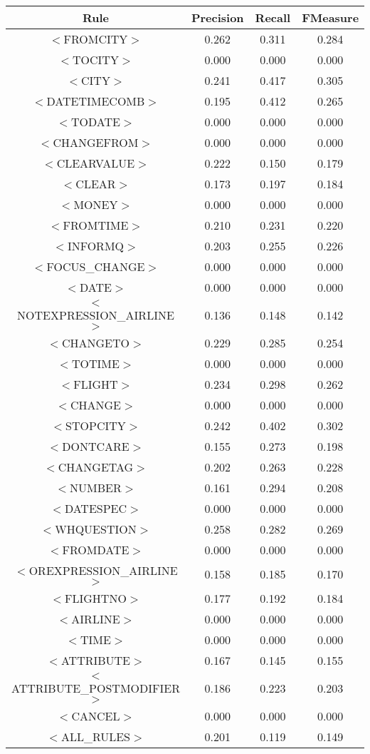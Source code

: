 \documentclass[a4paper,10pt]{article}
\begin{document}
\pagebreak
{} \label{tab:title} 
\begin{center}
\begin{tabular}{|c||c|c|c|}
\hline
Rule&Precision&Recall&FMeasure\\
\hline
\hline
$<$FROMCITY$>$&0.262&0.311&0.284 \\
\hline$<$TOCITY$>$&0.000&0.000&0.000 \\
\hline$<$CITY$>$&0.241&0.417&0.305 \\
\hline$<$DATETIMECOMB$>$&0.195&0.412&0.265 \\
\hline$<$TODATE$>$&0.000&0.000&0.000 \\
\hline$<$CHANGEFROM$>$&0.000&0.000&0.000 \\
\hline$<$CLEARVALUE$>$&0.222&0.150&0.179 \\
\hline$<$CLEAR$>$&0.173&0.197&0.184 \\
\hline$<$MONEY$>$&0.000&0.000&0.000 \\
\hline$<$FROMTIME$>$&0.210&0.231&0.220 \\
\hline$<$INFORMQ$>$&0.203&0.255&0.226 \\
\hline$<$FOCUS\_CHANGE$>$&0.000&0.000&0.000 \\
\hline$<$DATE$>$&0.000&0.000&0.000 \\
\hline$<$NOTEXPRESSION\_AIRLINE$>$&0.136&0.148&0.142 \\
\hline$<$CHANGETO$>$&0.229&0.285&0.254 \\
\hline$<$TOTIME$>$&0.000&0.000&0.000 \\
\hline$<$FLIGHT$>$&0.234&0.298&0.262 \\
\hline$<$CHANGE$>$&0.000&0.000&0.000 \\
\hline$<$STOPCITY$>$&0.242&0.402&0.302 \\
\hline$<$DONTCARE$>$&0.155&0.273&0.198 \\
\hline$<$CHANGETAG$>$&0.202&0.263&0.228 \\
\hline$<$NUMBER$>$&0.161&0.294&0.208 \\
\hline$<$DATESPEC$>$&0.000&0.000&0.000 \\
\hline$<$WHQUESTION$>$&0.258&0.282&0.269 \\
\hline$<$FROMDATE$>$&0.000&0.000&0.000 \\
\hline$<$OREXPRESSION\_AIRLINE$>$&0.158&0.185&0.170 \\
\hline$<$FLIGHTNO$>$&0.177&0.192&0.184 \\
\hline$<$AIRLINE$>$&0.000&0.000&0.000 \\
\hline$<$TIME$>$&0.000&0.000&0.000 \\
\hline$<$ATTRIBUTE$>$&0.167&0.145&0.155 \\
\hline$<$ATTRIBUTE\_POSTMODIFIER$>$&0.186&0.223&0.203 \\
\hline$<$CANCEL$>$&0.000&0.000&0.000 \\
\hline
\hline
$<$ALL\_RULES$>$&0.201&0.119&0.149 \\
\hline
\end{tabular}
\end{center}
\end{document}
